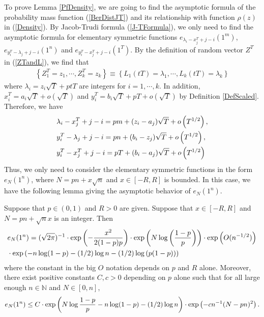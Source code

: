To prove Lemma \ref{PfDensity}, we are going to find the asymptotic formula of the probability mass function (\ref{BerDistJT}) and its relationship with function $\rho(z)$ in (\ref{Density}). By Jacob-Trudi formula (\ref	{J-TFormula}), we only need to find the asymptotic formula for elementary symmetric functions $e_{\lambda_{i}-x_{j}^{T}+j-i}(1^{m})$, $e_{y_{i}^{T}-\lambda_{j}+j-i}(1^{n})$ and $e_{y_{i}^{T}-x_{j}^{T}+j-i}(1^{T})$. By the definition of random vector $Z^{T}$ in (\ref{ZTandL}), we find that 
\begin{align}
	\left\{Z^{T}_{1}=z_1,\cdots, Z^{T}_{k}=z_k\right\}\equiv\left\{L_{1}(tT)=\lambda_1,\cdots,L_{k}(tT)=\lambda_k\right\}
\end{align}
where $\lambda_{i}=z_{i}\sqrt{T}+ptT$ are integers for $i=1,\cdots,k$. In addition, $x_{i}^{T}= a_{i}\sqrt{T}+o\left(\sqrt{T}\right)$ and $y_{i}^{T}= b_{i}\sqrt{T}+pT+o\left(\sqrt{T}\right)$ by Definition \ref{DefScaled}. Therefore, we have
\begin{equation}{\label{3N}}
\begin{split}
	&\lambda_{i}-x_{j}^{T}+j-i=pm+(z_i-a_j)\sqrt{T}+o\left(T^{1/2}\right),\\ 
	& y_{i}^{T}-\lambda_{j}+j-i=pn+(b_{i}-z_{j})\sqrt{T}+o\left(T^{1/2}\right),\\
	& y_{i}^{T}-x_{j}^{T}+j-i=pT+(b_i-a_j)\sqrt{T}+o\left(T^{1/2}\right)
\end{split}
\end{equation}
Thus, we only need to consider the elementary symmetric functions in the form $e_{N}(1^{n})$, where $N=pn+x\sqrt{n}$ and $x\in[-R,R]$ is bounded. In this case, we have the following lemma giving the asymptotic behavior of $e_{N}(1^{n})$.
\begin{lemma}{\label{Limh}}
	Suppose that $p\in(0,1)$ and $R>0$ are given. Suppose that $x\in[-R,R]$ and $N=pn+\sqrt{n}x$ is an integer. Then 
\begin{equation}
	\begin{split}{\label{AsympForh}}
&e_{N}(1^{n})=(\sqrt{2\pi})^{-1}\cdot \exp\left(-\frac{x^2}{2(1-p)p}\right)\cdot \exp\left(N\log\left(\frac{1-p}{p}\right)\right)\cdot \exp\left(O(n^{-1/2})\right)\\
& \cdot\exp\left(-n\log(1-p)-(1/2)\log n-(1/2)\log\left(p(1-p)\right)\right)
\end{split}
\end{equation}
where the constant in the big $O$ notation depends on $p$ and $R$ alone. Moreover, there exist positive constants $C,c>0$ depending on $p$ alone such that for all large enough $n\in\mathbb{N}$ and $N\in[0,n]$,
\begin{equation}{\label{ebounded}}
	e_{N}(1^n)\leq C\cdot \exp\left(N\log\frac{1-p}{p}-n\log(1-p)-(1/2)\log n\right)\cdot \exp\left(-cn^{-1}(N-pn)^2\right).
\end{equation}
\end{lemma}
